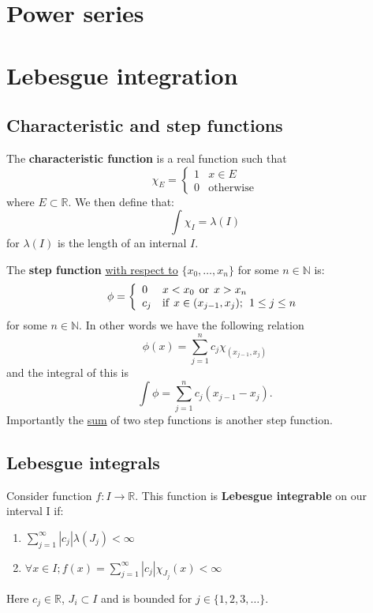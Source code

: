 \documentclass{article}
\begin{document}
\section{Power series}

\newpage

\section{Lebesgue integration}

\subsection{Characteristic and step functions}
The \textbf{characteristic function} is a real function such that
$$\chi_E =
\left\{
\begin{array}{ll}
	1  & \mbox{} x \in E \\
	0 & \mbox{otherwise}
\end{array}
\right.$$
where $E \subset \mathbb{R}$. We then define that:
$$\int \chi_{I} = \lambda(I)$$
for $\lambda(I)$ is the length of an internal $I$.

The \textbf{step function} \underline{with respect to} $\{x_0, \dots, x_n\}$
for some $n \in \mathbb{N}$ is:
$$\phi =
\left\{
\begin{array}{ll}
	0  &  x < x_0 \hspace{0.06in} \text{or} \hspace{0.06in} x > x_n \\
	c_j & \mbox{if} \hspace{0.06in} x \in (x_{j-1}, x_j); \hspace{0.06in} 1 \leq j \leq n
\end{array}
\right.$$
for some $n \in \mathbb{N}$. In other words we have the following relation
$$\phi(x) = \sum_{j=1}^{n} c_j \chi_{(x_{j-1}, x_j)}$$
and the integral of this is
$$\int \phi = \sum_{j=1}^{n} c_j (x_{j-1}-x_j).$$
Importantly the \underline{sum} of two step functions is another step function.
    
\newpage

\subsection{Lebesgue integrals}
Consider function $f:I \rightarrow \mathbb{R}$. This function is \textbf{Lebesgue integrable} on our interval I if:
\begin{enumerate}
    \item $\displaystyle\sum_{j=1}^{\infty} |c_j| \lambda(J_j) < \infty$

    \item $\forall x\in I; f(x)=\displaystyle\sum_{j=1}^{\infty} |c_j| \chi_{J_j}(x)<\infty$
\end{enumerate}
Here $c_j \in \mathbb{R}$, $J_i \subset I$ and is bounded for $j \in \{1, 2, 3, \dots\}$.
\end{document}
